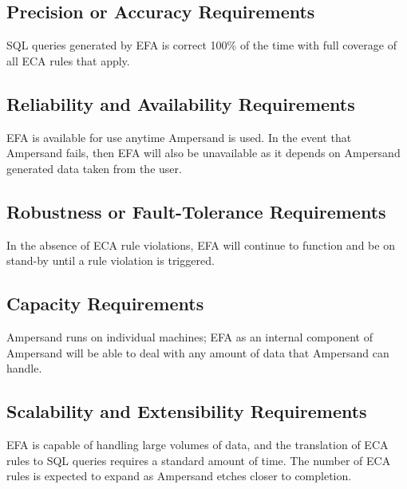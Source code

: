 \subsection{Precision or Accuracy Requirements}\label{subsec:AccuracyReq}
SQL queries generated by EFA is correct 100\% of the time with full coverage of 
all ECA rules that apply.
 
\subsection{Reliability and Availability Requirements}\label{subsec:AvailReq}
EFA is available for use anytime Ampersand is used. In the event that Ampersand 
fails, then EFA will also be unavailable as it depends on Ampersand generated 
data taken from the user.

\subsection{Robustness or Fault-Tolerance Requirements}\label{subsec:FaultReq}

In the absence of ECA rule violations, EFA will continue to function and be on 
stand-by until a rule violation is triggered.

\subsection{Capacity Requirements}\label{subsec:CapacityReq}
Ampersand runs on individual machines; EFA as an internal component of 
Ampersand will be able to deal with any amount of data that Ampersand can 
handle. 

\subsection{Scalability and Extensibility 
Requirements}\label{subsec:ScalabilityReq}
EFA is capable of handling large volumes of data, and the translation of ECA 
rules to SQL queries requires a standard amount of time. The number of ECA 
rules is expected to expand as Ampersand etches closer to completion. 

